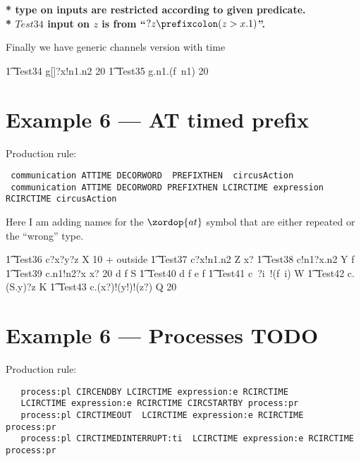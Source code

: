 \documentclass{article}
\newcommand{\lcirctime}{\zopenop{(}}
\newcommand{\rcirctime}{\zcloseop{)}}
\newcommand{\circat}{\zordop{at}}
\begin{document}
\textbf{* type on inputs are restricted according to given predicate.}
\\
\indent \textbf{* $Test34$ input on $z$ is from ``$?z \prefixcolon (z > x.1)$''.}

Finally we have generic channels version with time
%
\begin{circusaction}
   \t1 Test34 \circdef g[\nat \cross \nat \cross \nat]?x!n1.n2 \then \lcirctime 20 \rcirctime \Skip
        \also
   \t1 Test35 \circdef g.n1.(f~n1) \then \lcirctime 20 \rcirctime \Skip 
\end{circusaction}


\section{Example 6 --- AT timed prefix}

Production rule:
\begin{verbatim}
 communication ATTIME DECORWORD  PREFIXTHEN  circusAction
 communication ATTIME DECORWORD PREFIXTHEN LCIRCTIME expression RCIRCTIME circusAction
\end{verbatim}

Here I am adding names for the $\circat$ symbol that are either repeated or the ``wrong'' type.
%
\begin{circusaction}
   \t1 Test36 \circdef c?x?y?z \circat X \then \lcirctime 10 + outside \rcirctime \Skip
   \also
   \t1 Test37 \circdef c?x!n1.n2 \circat Z \then \lcirctime x? \rcirctime \Skip 
   \also
   \t1 Test38 \circdef c!n1?x.n2 \circat Y \then \lcirctime f \rcirctime \Skip
   \also
   \t1 Test39 \circdef c.n1!n2?x \circat x? \then \lcirctime 20 \rcirctime d \circat f \then \lcirctime \theta S \rcirctime \Skip 
   \also
   \t1 Test40 \circdef d \then \lcirctime f \rcirctime e \then \lcirctime f \rcirctime \Skip 
   \also
   \t1 Test41 \circdef c~?i~!(f~i) \circat W \then \Skip
       \also
   \t1 Test42 \circdef c.(S.y)?z \circat K \then \Skip
       \also
   \t1 Test43 \circdef c.(x?)!(y!)!(z?) \circat Q \then \lcirctime 20 \rcirctime \Skip 
\end{circusaction}    
				
\section{Example 6 --- Processes TODO}

Production rule:
\begin{verbatim}
   process:pl CIRCENDBY LCIRCTIME expression:e RCIRCTIME
   LCIRCTIME expression:e RCIRCTIME CIRCSTARTBY process:pr
   process:pl CIRCTIMEOUT  LCIRCTIME expression:e RCIRCTIME  process:pr
   process:pl CIRCTIMEDINTERRUPT:ti  LCIRCTIME expression:e RCIRCTIME  process:pr
\end{verbatim}
\end{document}
